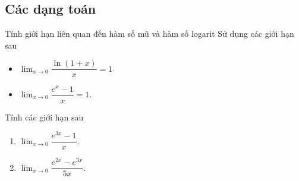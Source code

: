 \subsection{Các dạng toán}
\begin{dang}{Tính giới hạn liên quan đến hàm số mũ và hàm số logarit}
Sử dụng các giới hạn sau
\begin{itemize}
\item $\displaystyle \lim_{x \to 0}\dfrac{\ln(1+x)}{x}=1$.
\item $\displaystyle \lim_{x \to 0}\dfrac{e^x-1}{x}=1$.
\end{itemize}
\end{dang}
\begin{vd}%
Tính các giới hạn sau\\
\begin{enumerate}
        \item $\displaystyle \lim_{x \to 0}\dfrac{e^{3x}-1}{x}$. 
        \item $\displaystyle \lim_{x \to 0}\dfrac{e^{2x}-e^{3x}}{5x}$.
    \end{enumerate}
\end{vd}

